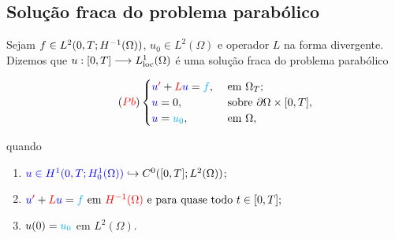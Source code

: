 \subsection*{Solução fraca do problema parabólico}
\begin{frame}
\begin{defin}
Sejam {\color{cyan} \(f\in L^2(0,T;H^{-1}(\Omega))\)}, {\color{cyan}\(u_0\in L^2(\Omega)\)} e  
operador {\color{red} \(L\)} na forma divergente. Dizemos que 
{\color{blue}\(u:[0,T]\longrightarrow L_{\operatorname{loc}}^1(\Omega)\)} é uma {\color{blue}solução fraca} do 
problema parabólico 
\begin{center}
\vspace{-1.5em}
\begin{minipage}{0.7\textwidth}
\begin{equation}\label{pb-parb} \tag{{\color{red}\(Pb\)}}\lnum 
\begin{cases}
{\color{blue}u}^{{\color{red}\prime}}+{\color{red}L}{\color{blue}u}
={\color{cyan}f}, & \text{ em } \Omega_T;\\
{\color{blue}u}=0, & \text{ sobre } \partial \Omega\times [0,T],\\
{\color{blue}u}={\color{cyan}u_0}, & \text{ em } \Omega,
\end{cases}
\end{equation}
\end{minipage}
\end{center}
quando
\begin{enumerate}[a]
\item \({\color{blue}u\in H^1(0,T;H_0^1(\Omega))}\hookrightarrow C^0([0,T];L^2(\Omega))\);
\item 
\({\color{blue}u}^{{\color{red}\prime}}+{\color{red}L}{\color{blue}u}
={\color{cyan}f} \text{ em } {\color{red}H^{-1}(\Omega)} \text{ e  para quase todo } t\in [0,T];
\)
\item \(u(0)={\color{cyan}u_0}\) em \(L^2(\Omega)\). 
\end{enumerate}
\end{defin}
\end{frame}
